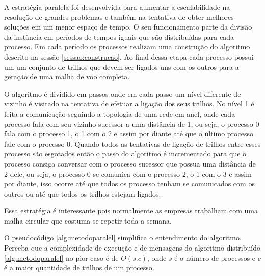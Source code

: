 A estratégia paralela foi desenvolvida para aumentar a escalabilidade na
resolução de grandes problemas e também na tentativa de obter melhores soluções
em um menor espaço de tempo. O seu funcionamento parte da divisão da instância
em períodos de tempos iguais que são distribuídas para cada processo. Em cada
período os processos realizam uma construção do algoritmo descrito na sessão
\ref{sessao:construcao}. Ao final dessa etapa cada processo possui um um
conjunto de trilhos que devem ser ligados uns com os outros para a geração de
uma malha de voo completa.
 
O algoritmo é dividido em passos onde em cada passo um
nível diferente de vizinho é visitado na tentativa de efetuar a ligação dos seus
trilhos. No nível 1 é feita a comunicação seguindo a topologia de uma
rede em anel, onde cada processo fala com seu vizinho sucessor a uma distância
de 1, ou seja, o processo 0 fala com o processo 1, o 1 com o 2 e assim por
diante até que o último processo fale com o processo 0. Quando todos as tentativas de
ligação de trilhos entre esses processo são esgotados então o passo do algoritmo
é incrementado para que o processo consiga conversar com o processo sucessor que
possua uma distância de 2 dele, ou seja, o processo 0 se comunica com o processo
2, o 1 com o 3 e assim por diante, isso ocorre até que todos os processo tenham
se comunicados com os outros ou até que todos os trilhos estejam ligados.

Essa estratégia é interessante pois normalmente as empresas trabalham com uma
malha circular que costuma se repetir toda a semana.

O pseudocódigo \ref{alg:metodoparalel} simplifica o entendimento do algoritmo.
Perceba que a complexidade de execução e de mensagens do algoritmo distribuído
\ref{alg:metodoparalel} no pior caso é de $O(s.c)$, onde $s$ é o número de
processos e $c$ é a maior quantidade de trilhos de um processo.


